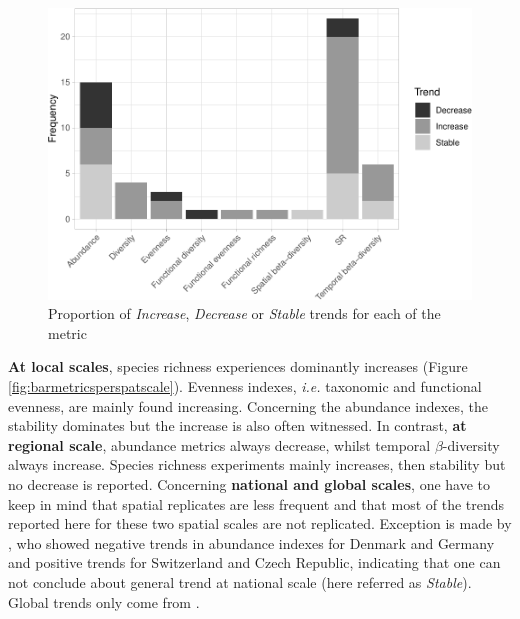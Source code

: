 \documentclass[
  12pt,
  oneside]{report}
\begin{document}
\begin{figure}
\centering
\includegraphics{literature_review_files/figure-latex/barmetrics-1.pdf}
\caption{\label{fig:barmetrics}Proportion of \emph{Increase}, \emph{Decrease} or \emph{Stable} trends for each of the metric}
\end{figure}

\textbf{At local scales}, species richness experiences dominantly increases (Figure \ref{fig:barmetricsperspatscale}). Evenness indexes, \emph{i.e.} taxonomic and functional evenness, are mainly found increasing. Concerning the abundance indexes, the stability dominates but the increase is also often witnessed. In contrast, \textbf{at regional scale}, abundance metrics always decrease, whilst temporal \(\beta\)-diversity always increase. Species richness experiments mainly increases, then stability but no decrease is reported. Concerning \textbf{national and global scales}, one have to keep in mind that spatial replicates are less frequent and that most of the trends reported here for these two spatial scales are not replicated. Exception is made by \textcite{bowler_geographic_2021}, who showed negative trends in abundance indexes for Denmark and Germany and positive trends for Switzerland and Czech Republic, indicating that one can not conclude about general trend at national scale (here referred as \emph{Stable}). Global trends only come from \textcite{jarzyna_taxonomic_2018}.
\end{document}
